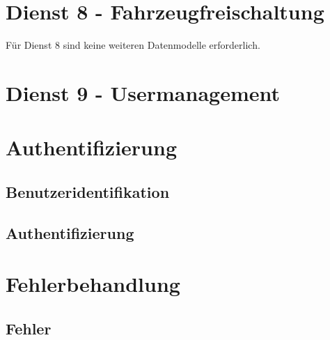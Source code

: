 \section{Dienst 8 - Fahrzeugfreischaltung}
\label{sec:Datenmodell:Dienst8}
Für Dienst 8 sind keine weiteren Datenmodelle erforderlich.

\section{Dienst 9 - Usermanagement}
\label{sec:Datenmodell:Dienst9}



\section{Authentifizierung}
\label{sec:Datenmodell:Auth}

\subsection*{Benutzeridentifikation}



\subsection*{Authentifizierung}




\section{Fehlerbehandlung}
\subsection*{Fehler}



